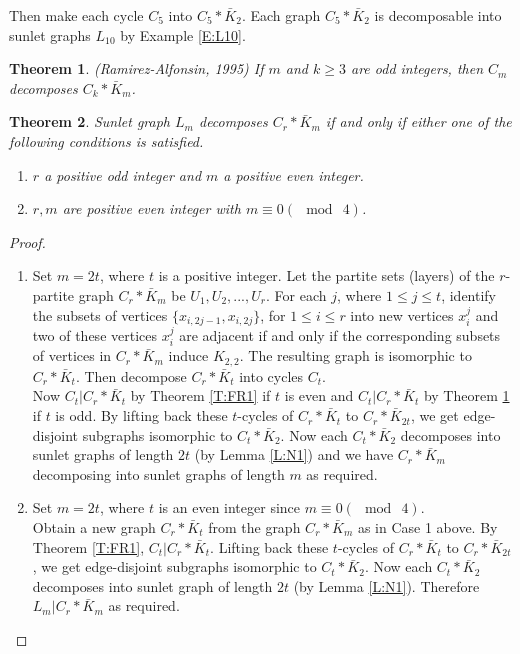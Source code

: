 \documentclass[12pt]{report}
\newcommand{\ben}{\begin{enumerate}}
\newcommand{\een}{\end{enumerate}}
\newtheorem{thm}{Theorem}[section]
\begin{document}
Then make each cycle $C_5$ into $C_5*\bar{K}_2$. Each graph
$C_5*\bar{K}_2$ is decomposable into sunlet graphs $L_{10}$ by
Example \ref{E:L10}.
\begin{thm}\label{T:RAF} (Ramirez-Alfonsin, 1995)%
If $m$ and $k\geq 3$ are odd integers, then $C_m$ decomposes
$C_k*\bar{K}_m$.
\end{thm}
\begin{thm}\label{T:M1}
Sunlet graph $L_m$ decomposes  $C_{r}*\bar{K}_{m}$ if and only if
either one of the following conditions is satisfied.
 \ben
\item $r$ a positive odd integer and  $m$ a positive even integer.
\item $r,m$ are positive even integer with $m\equiv 0(\mod\ 4)$.
\een
\end{thm}
\begin{proof}
\ben
\item  %
 Set $m=2t$, where $t$ is a positive integer. Let the partite sets (layers) of the $r$-partite graph $C_{r}*\bar{K}_{m}$ be $U_1,U_2,...,U_r$. For each $j$, where $1\leq j\leq t$, identify the subsets of vertices $\{x_{i,2j-1},x_{i,2j}\}$, for $1\leq i\leq r$ into new vertices $x_i^j$ and two of these vertices $x_i^j$ are adjacent if and only if the corresponding subsets of vertices in $C_{r}*\bar{K}_{m}$ induce $K_{2,2}$. The resulting graph is isomorphic to $C_{r}*\bar{K}_{t}$. Then decompose $C_{r}*\bar{K}_{t}$ into cycles $C_t$.\\
Now $C_t|C_r*\bar{K}_t$ by Theorem  \ref{T:FR1} if $t$ is even and
$C_t|C_r*\bar{K}_t$ by Theorem \ref{T:RAF} if $t$ is odd. By lifting
back these $t$-cycles of $C_{r}*\bar{K}_{t}$ to
$C_{r}*\bar{K}_{2t}$, we get edge-disjoint subgraphs isomorphic to
$C_t*\bar{K}_2$. Now each $C_t*\bar{K}_2$ decomposes into sunlet
graphs of length $2t$ (by Lemma \ref{L:N1}) and we have
$C_r*\bar{K}_m$ decomposing into sunlet graphs of length $m$ as
required.
\item %
Set $m=2t$, where $t$ is an even integer since $m\equiv 0(\mod\ 4)$.\\
Obtain a new graph $C_r*\bar{K}_t$ from the graph $C_r*\bar{K}_m$ as
in Case 1 above. By Theorem \ref{T:FR1}, $C_t|C_r*\bar{K}_t$.
Lifting back these $t$-cycles of $C_r*\bar{K}_t$ to
$C_r*\bar{K}_{2t}$, we get edge-disjoint subgraphs isomorphic to
$C_t*\bar{K}_2$. Now each $C_t*\bar{K}_2$ decomposes into sunlet
graph of length $2t$ (by Lemma \ref{L:N1}). Therefore
$L_m|C_r*\bar{K}_m$ as required.
\een
\end{proof}
\end{document}
